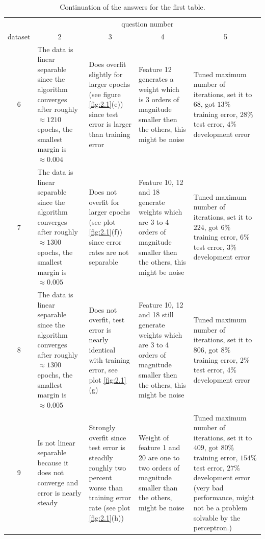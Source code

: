 \documentclass[12pt]{article}
\begin{document}
\begin{table}[H]
	\centering
	\begin{tabularx}{\textwidth}{c|X|X|X|X|}
		& \multicolumn{4}{c|}{question number} \\
		dataset & \multicolumn{1}{c}{2} & \multicolumn{1}{c}{3} & \multicolumn{1}{c}{4} & \multicolumn{1}{c|}{5} \\
		\midrule
		6     &   The data is linear separable since the algorithm converges after roughly $\approx 1210$ epochs, the smallest margin is $\approx 0.004$     &    Does overfit slightly for larger epochs (see figure \ref{fig:2.1}(e)) since test error is larger than training error   &   Feature 12 generates a weight which is 3 orders of magnitude smaller then the others, this might be noise    & Tuned maximum number of iterations, set it to $68$, got $13\%$ training error, $28\%$ test error, $4\%$ development error \\
		\midrule
		7     &   The data is linear separable since the algorithm converges after roughly $\approx 1300$ epochs,  the smallest margin is $\approx 0.005$    &    Does not overfit for larger epochs (see plot \ref{fig:2.1}(f)) since error rates are not separable   &   Feature 10, 12 and 18 generate weights which are 3 to 4 orders of magnitude smaller then the others, this might be noise    & Tuned maximum number of iterations, set it to $224$, got $6\%$ training error, $6\%$ test error, $3\%$ development error \\
		\midrule
		8     &   The data is linear separable since the algorithm converges after roughly $\approx 1300$ epochs,  the smallest margin is $\approx 0.005$    &    Does not overfit, test error is nearly identical with training error, see plot \ref{fig:2.1}(g)   &   Feature 10, 12 and 18 still generate weights which are 3 to 4 orders of magnitude smaller then the others, this might be noise    & Tuned maximum number of iterations, set it to $806$, got $8\%$ training error, $2\%$ test error, $4\%$ development error \\
		\midrule
		9     &   Is not linear separable because it does not converge and error is nearly steady    &    Strongly overfit since test error is steadily roughly two percent worse than training error rate (see plot \ref{fig:2.1}(h))   &   Weight of feature 1 and 20 are one to two orders of magnitude smaller than the others, might be noise    & Tuned maximum number of iterations, set it to $409$, got $80\%$ training error, $154\%$ test error, $27\%$ development error (very bad performance, might not be a problem solvable by the perceptron.) \\
		\bottomrule
	\end{tabularx}%
	\caption{Continuation of the answers for the first table.}
	\label{tab:2}%
\end{table}%
\end{document}
